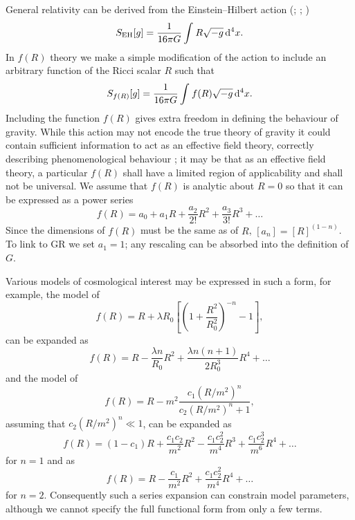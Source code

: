 General relativity can be derived from the Einstein--Hilbert action (\citealt[chapter 21]{Misner1973}; \citealt[section 93]{Landau1975}; \citealt[section 26]{Dirac1996})
\begin{equation}
S_\mathrm{EH}[g] = \dfrac{1}{16\pi G}\int_{}^{}{R\sqrt{-g}}\,\mathrm{d}{^4x}.
\end{equation}
In $f(R)$ theory we make a simple modification of the action to include an arbitrary function of the Ricci scalar $R$ such that \citep{Buchdahl1970}
\begin{equation}
S_{f(R)}[g] = \dfrac{1}{16\pi G}\int_{}^{}{f(R)\sqrt{-g}}\,\mathrm{d}{^4x}.
\end{equation}
Including the function $f(R)$ gives extra freedom in defining the behaviour of gravity. While this action may not encode the true theory of gravity it could contain sufficient information to act as an effective field theory, correctly describing phenomenological behaviour \citep{Park2010}; it may be that as an effective field theory, a particular $f(R)$ shall have a limited region of applicability and shall not be universal. We assume that $f(R)$ is analytic about $R = 0$ so that it can be expressed as a power series \citep{Buchdahl1970, Faulkner2007, Clifton2008} %
\begin{equation}
f(R) = a_0 + a_1 R + \dfrac{a_2}{2!}R^2 + \dfrac{a_3}{3!}R^3 + \ldots
\end{equation}
Since the dimensions of $f(R)$ must be the same as of $R$, $[a_n] = [R]^{(1-n)}$. To link to GR we set $a_1 = 1$; any rescaling can be absorbed into the definition of $G$.

Various models of cosmological interest may be expressed in such a form, for example, the model of \citet{Starobinsky2007}
\begin{equation}
f(R) = R + \lambda R_0 \left[\left(1 + \dfrac{R^2}{R_0^2}\right)^{-n} - 1\right],
\end{equation}
can be expanded as
\begin{equation}
f(R) = R - \dfrac{\lambda n}{R_0} R^2 + \dfrac{\lambda n (n + 1)}{2 R_0^3} R^4 + \ldots
\end{equation}
and the model of \citet{Hu2007}
\begin{equation}
f(R) = R - m^2\dfrac{c_1\left(R/m^2\right)^n}{c_2\left(R/m^2\right)^n + 1},
\end{equation}
assuming that $c_2(R/m^2)^n \ll 1$, can be expanded as
\begin{equation}
f(R) = (1 - c_1)R + \dfrac{c_1 c_2}{m^2}R^2 - \dfrac{c_1 c_2^2}{m^4}R^3 + \dfrac{c_1 c_2^3}{m^6}R^4 + \ldots 
\end{equation}
for $n = 1$ and as
\begin{equation}
f(R) = R - \dfrac{c_1}{m^2}R^2 + \dfrac{c_1 c_2^2}{m^4}R^4 + \ldots
\end{equation}
for $n = 2$. Consequently such a series expansion can constrain model parameters, although we cannot specify the full functional form from only a few terms.

